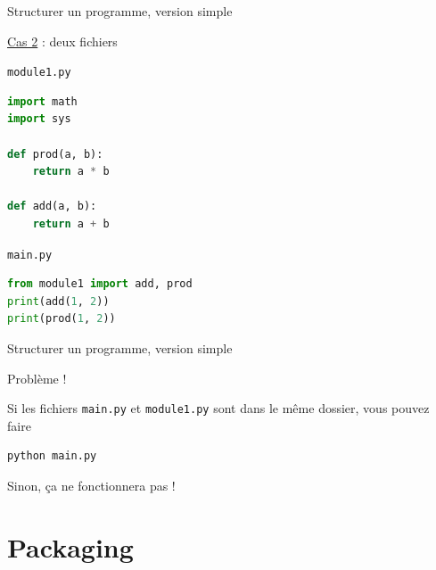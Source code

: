 \documentclass[10pt]{beamer}
\begin{document}
\begin{frame}[fragile]{Structurer un programme, version simple}

  \underline{Cas 2} : deux fichiers

  \texttt{module1.py}
\begin{lstlisting}[language=python, numbers=none]
import math
import sys

def prod(a, b):
    return a * b

def add(a, b):
    return a + b
\end{lstlisting} 

\texttt{main.py}

\begin{lstlisting}[language=python, numbers=none]
from module1 import add, prod
print(add(1, 2))
print(prod(1, 2))
\end{lstlisting} 
\end{frame}


\begin{frame}[fragile]{Structurer un programme, version simple}

  \begin{block}{Problème !}
    \medskip

    Si les fichiers \texttt{main.py} et \texttt{module1.py} sont dans le même dossier, vous pouvez faire
\begin{lstlisting}[language=bash, numbers=none]
python main.py
\end{lstlisting}

  Sinon, ça ne fonctionnera pas !
  \end{block}
\end{frame}



\section{Packaging}
\end{document}
